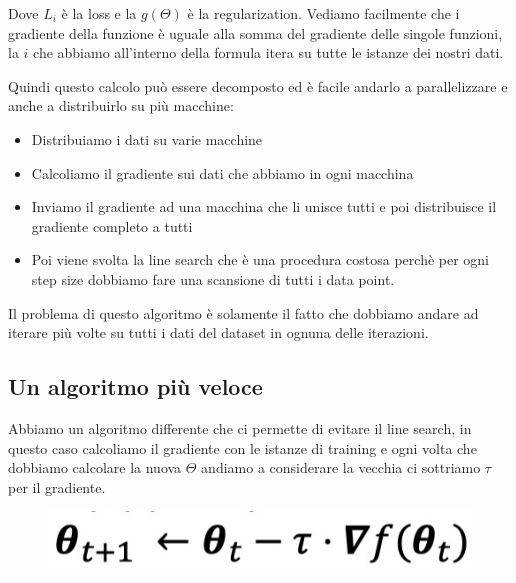 \documentclass[14pt]{extreport}
\begin{document}
Dove $L_i$ è la loss e la $g(\Theta)$ è la regularization. Vediamo facilmente che i gradiente della funzione è uguale alla somma del gradiente delle
singole funzioni, la $i$ che abbiamo all'interno della formula itera su tutte le istanze dei nostri dati.

Quindi questo calcolo può essere decomposto ed è facile andarlo a parallelizzare e anche a distribuirlo su più macchine:

\begin{itemize}
\item Distribuiamo i dati su varie macchine
\item Calcoliamo il gradiente sui dati che abbiamo in ogni macchina
\item Inviamo il gradiente ad una macchina che li unisce tutti e poi distribuisce il gradiente completo a tutti
\item Poi viene svolta la line search che è una procedura costosa perchè per ogni step size dobbiamo fare una scansione di tutti i data point.
\end{itemize}

Il problema di questo algoritmo è solamente il fatto che dobbiamo andare ad iterare più volte su tutti i dati del dataset in ognuna delle iterazioni.

\subsection{Un algoritmo più veloce}

Abbiamo un algoritmo differente che ci permette di evitare il line search, in questo caso calcoliamo il gradiente con le istanze di training e ogni
volta che dobbiamo calcolare la nuova $\Theta$ andiamo a considerare la vecchia ci sottriamo $\tau$ per il gradiente.

\begin{figure}[H]
\centering
\includegraphics[width=0.7\linewidth]{246.jpeg}
\end{figure}
\end{document}
